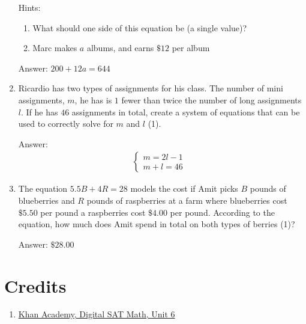 \documentclass{article}
\begin{document}
\begin{enumerate}
{	      Hints:
	      \begin{enumerate}
		      \item {What should one side of this equation be (a single value)?}
		      \item {Marc makes $a$ albums, and earns $\$12$ per album}
	      \end{enumerate}

	      Answer: \(200+12a=644\)
	      }
	\item {
	      Ricardio has two types of assignments for his class. The number of mini assignments, $m$, he has is $1$ fewer than twice the number of long assignments $l$. If he has $46$ assignments in total, create a system of equations that can be used to correctly solve for $m$ and $l$ (1).

	      Answer:
	      \[
		      \begin{array}{l}
			      \begin{cases}
				      m=2l-1 & \\
				      m+l=46
			      \end{cases}
		      \end{array}
	      \]
	      }
	\item {The equation \(5.5B+4R=28\) models the cost if Amit picks $B$ pounds of blueberries and $R$ pounds of raspberries at a farm where blueberries cost $\$5.50$ per pound a raspberries cost $\$4.00$ per pound. According to the equation, how much does Amit spend in total on both types of berries (1)?

		      Answer: $\$28.00$}


\end{enumerate}

\section{Credits}
\begin{enumerate}

	\item{
	      \href{https://www.khanacademy.org/test-prep/v2-sat-math/x0fcc98a58ba3bea7:algebra-medium}{Khan Academy, Digital SAT Math, Unit 6}}

\end{enumerate}
\end{document}
